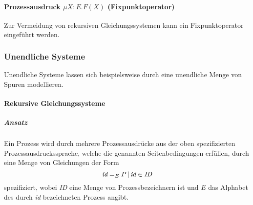 					\paragraph{Prozessausdruck $ \mu X : E.F(X) $ (Fixpunktoperator)}
						Zur Vermeidung von rekursiven Gleichungssystemen kann ein Fixpunktoperator eingeführt werden.


			\subsubsection{Unendliche Systeme}
				Unendliche Systeme lassen sich beispielsweise durch eine unendliche Menge von Spuren modellieren.

				\paragraph{Rekursive Gleichungssysteme}
					\subparagraph{Ansatz}
						Ein Prozess wird durch mehrere Prozessausdrücke aus der oben spezifizierten Prozessausdruckssprache, welche die genannten Seitenbedingungen erfüllen, durch eine Menge von Gleichungen der Form \[ \textit{id} = _ E P \,\vert\, \textit{id} \in \textit{ID} \] spezifiziert, wobei \textit{ID} eine Menge von Prozessbezeichnern ist und $ E $  das Alphabet des durch \textit{id} bezeichneten Prozess angibt.

